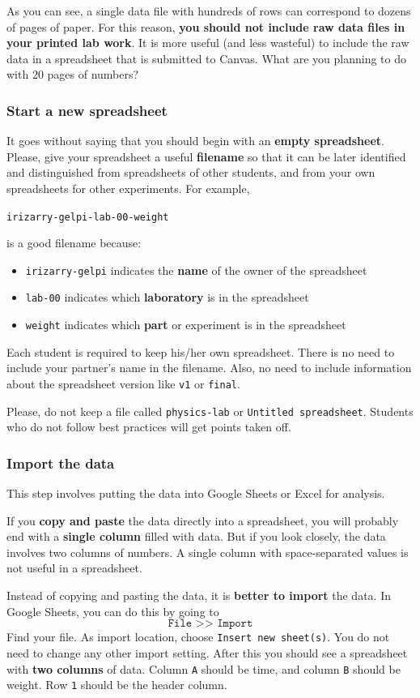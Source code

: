 As you can see, a single data file with hundreds of rows can correspond to dozens of pages of paper. For this reason, \textbf{you should not include raw data files in your printed lab work}. It is more useful (and less wasteful) to include the raw data in a spreadsheet that is submitted to Canvas. What are you planning to do with 20 pages of numbers?
%
\subsubsection{Start a new spreadsheet}
%
It goes without saying that you should begin with an \textbf{empty spreadsheet}. Please, give your spreadsheet a useful \textbf{filename} so that it can be later identified and distinguished from spreadsheets of other students, and from your own spreadsheets for other experiments. For example,
\begin{center}
    \texttt{irizarry-gelpi-lab-00-weight}
\end{center}
is a good filename because:
\begin{itemize}
    \item \texttt{irizarry-gelpi} indicates the \textbf{name} of the owner of the spreadsheet
    \item \texttt{lab-00} indicates which \textbf{laboratory} is in the spreadsheet
    \item \texttt{weight} indicates which \textbf{part} or experiment is in the spreadsheet
\end{itemize}
Each student is required to keep his/her own spreadsheet. There is no need to include your partner's name in the filename. Also, no need to include information about the spreadsheet version like \texttt{v1} or \texttt{final}.

Please, do not keep a file called \texttt{physics-lab} or \texttt{Untitled spreadsheet}. Students who do not follow best practices will get points taken off.
%
\subsubsection{Import the data}
%
This step involves putting the data into Google Sheets or Excel for analysis.

If you \textbf{copy and paste} the data directly into a spreadsheet, you will probably end with a \textbf{single column} filled with data. But if you look closely, the data involves two columns of numbers. A single column with space-separated values is not useful in a spreadsheet.

Instead of copying and pasting the data, it is \textbf{better to import} the data. In Google Sheets, you can do this by going to
\begin{equation}
    \texttt{File >> Import}
\end{equation}
Find your file. As import location, choose \texttt{Insert new sheet(s)}. You do not need to change any other import setting. After this you should see a spreadsheet with \textbf{two columns} of data. Column \texttt{A} should be time, and column \texttt{B} should be weight. Row \texttt{1} should be the header column.

